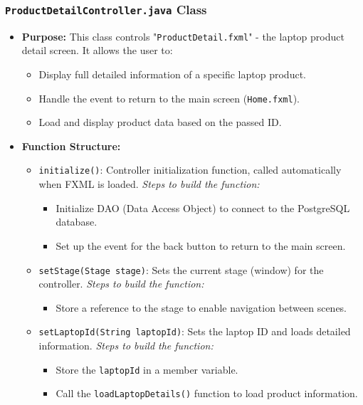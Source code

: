 \documentclass{article}
\begin{document}
\subsubsection{\texttt{ProductDetailController.java} Class}
\begin{itemize}
    \item \textbf{Purpose:} This class controls "\texttt{ProductDetail.fxml}" - the laptop product detail screen. It allows the user to:
    \begin{itemize}
        \item Display full detailed information of a specific laptop product.
        \item Handle the event to return to the main screen (\texttt{Home.fxml}).
        \item Load and display product data based on the passed ID.
    \end{itemize}
    \item \textbf{Function Structure:}
    \begin{itemize}
        \item \texttt{initialize()}: Controller initialization function, called automatically when FXML is loaded.
        \subitem \textit{Steps to build the function:}
        \begin{itemize}
            \item Initialize DAO (Data Access Object) to connect to the PostgreSQL database.
            \item Set up the event for the back button to return to the main screen.
        \end{itemize}
        \item \texttt{setStage(Stage stage)}: Sets the current stage (window) for the controller.
        \subitem \textit{Steps to build the function:}
        \begin{itemize}
            \item Store a reference to the stage to enable navigation between scenes.
        \end{itemize}
        \item \texttt{setLaptopId(String laptopId)}: Sets the laptop ID and loads detailed information.
        \subitem \textit{Steps to build the function:}
        \begin{itemize}
            \item Store the \texttt{laptopId} in a member variable.
            \item Call the \texttt{loadLaptopDetails()} function to load product information.

\end{itemize}
\end{itemize}
\end{itemize}
\end{document}
